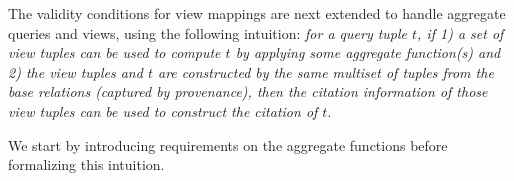 







The validity conditions for view mappings are next extended to handle aggregate queries and views, using the following intuition: {\em for a query tuple $t$, if 1) a set of view tuples can be used to compute $t$ by applying some aggregate function(s) and 2) the view tuples and $t$ are constructed by the same multiset of tuples from the base relations (captured by provenance), then the citation information of those view tuples can be used to construct the citation of $t$}.


We start by introducing requirements on the %
aggregate functions before formalizing this intuition.

